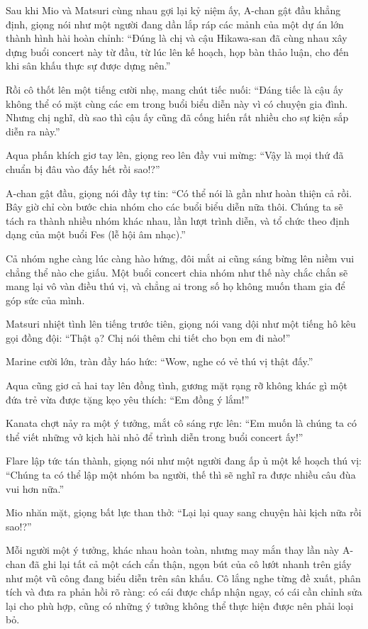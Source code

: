 \documentclass[../main.tex]{subfiles}
\begin{document}
Sau khi Mio và Matsuri cùng nhau gợi lại kỷ niệm ấy, A-chan gật đầu khẳng định, giọng nói như một người đang dần lắp ráp các mảnh của một dự án lớn thành hình hài hoàn chỉnh: ``Đúng là chị và cậu Hikawa-san đã cùng nhau xây dựng buổi concert này từ đầu, từ lúc lên kế hoạch, họp bàn thảo luận, cho đến khi sân khấu thực sự được dựng nên.''

Rồi cô thốt lên một tiếng cười nhẹ, mang chút tiếc nuối: ``Đáng tiếc là cậu ấy không thể có mặt cùng các em trong buổi biểu diễn này vì có chuyện gia đình. Nhưng chị nghĩ, dù sao thì cậu ấy cũng đã cống hiến rất nhiều cho sự kiện sắp diễn ra này.''

Aqua phấn khích giơ tay lên, giọng reo lên đầy vui mừng: ``Vậy là mọi thứ đã chuẩn bị đâu vào đấy hết rồi sao!?''

A-chan gật đầu, giọng nói đầy tự tin: ``Có thể nói là gần như hoàn thiện cả rồi. Bây giờ chỉ còn bước chia nhóm cho các buổi biểu diễn nữa thôi. Chúng ta sẽ tách ra thành nhiều nhóm khác nhau, lần lượt trình diễn, và tổ chức theo định dạng của một buổi Fes (lễ hội âm nhạc).''

Cả nhóm nghe càng lúc càng hào hứng, đôi mắt ai cũng sáng bừng lên niềm vui chẳng thể nào che giấu. Một buổi concert chia nhóm như thế này chắc chắn sẽ mang lại vô vàn điều thú vị, và chẳng ai trong số họ không muốn tham gia để góp sức của mình.


Matsuri nhiệt tình lên tiếng trước tiên, giọng nói vang dội như một tiếng hô kêu gọi đồng đội: ``Thật ạ? Chị nói thêm chi tiết cho bọn em đi nào!''

Marine cười lớn, tràn đầy háo hức: ``Wow, nghe có vẻ thú vị thật đấy.''

Aqua cũng giơ cả hai tay lên đồng tình, gương mặt rạng rỡ không khác gì một đứa trẻ vừa được tặng kẹo yêu thích: ``Em đồng ý lắm!''

Kanata chợt nảy ra một ý tưởng, mắt cô sáng rực lên: ``Em muốn là chúng ta có thể viết những vở kịch hài nhỏ để trình diễn trong buổi concert ấy!''

Flare lập tức tán thành, giọng nói như một người đang ấp ủ một kế hoạch thú vị: ``Chúng ta có thể lập một nhóm ba người, thế thì sẽ nghĩ ra được nhiều câu đùa vui hơn nữa.''

Mio nhăn mặt, giọng bất lực than thở: ``Lại lại quay sang chuyện hài kịch nữa rồi sao!?''

Mỗi người một ý tưởng, khác nhau hoàn toàn, nhưng may mắn thay lần này A-chan đã ghi lại tất cả một cách cẩn thận, ngọn bút của cô lướt nhanh trên giấy như một vũ công đang biểu diễn trên sân khấu. Cô lắng nghe từng đề xuất, phân tích và đưa ra phản hồi rõ ràng: có cái được chấp nhận ngay, có cái cần chỉnh sửa lại cho phù hợp, cũng có những ý tưởng không thể thực hiện được nên phải loại bỏ.
\end{document}
